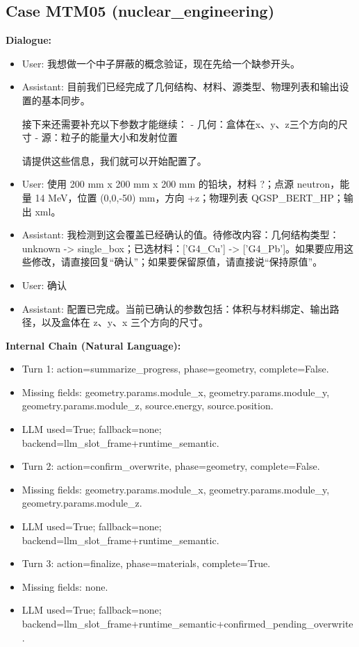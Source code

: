 \documentclass[11pt]{ctexart}
\begin{document}
\subsection{Case MTM05 (nuclear\_engineering)}
\textbf{Dialogue:}
\begin{itemize}
\item User: 我想做一个中子屏蔽的概念验证，现在先给一个缺参开头。
\item Assistant: 目前我们已经完成了几何结构、材料、源类型、物理列表和输出设置的基本同步。

接下来还需要补充以下参数才能继续：
- 几何：盒体在x、y、z三个方向的尺寸
- 源：粒子的能量大小和发射位置

请提供这些信息，我们就可以开始配置了。
\item User: 使用 200 mm x 200 mm x 200 mm 的铅块，材料 ?；点源 neutron，能量 14 MeV，位置 (0,0,-50) mm，方向 +z；物理列表 QGSP\_BERT\_HP；输出 xml。
\item Assistant: 我检测到这会覆盖已经确认的值。待修改内容：几何结构类型：unknown -> single\_box；已选材料：['G4\_Cu'] -> ['G4\_Pb']。如果要应用这些修改，请直接回复“确认”；如果要保留原值，请直接说“保持原值”。
\item User: 确认
\item Assistant: 配置已完成。当前已确认的参数包括：体积与材料绑定、输出路径，以及盒体在 z、y、x 三个方向的尺寸。
\end{itemize}
\textbf{Internal Chain (Natural Language):}
\begin{itemize}
\item Turn 1: action=summarize\_progress, phase=geometry, complete=False.
\item Missing fields: geometry.params.module\_x, geometry.params.module\_y, geometry.params.module\_z, source.energy, source.position.
\item LLM used=True; fallback=none; backend=llm\_slot\_frame+runtime\_semantic.
\item Turn 2: action=confirm\_overwrite, phase=geometry, complete=False.
\item Missing fields: geometry.params.module\_x, geometry.params.module\_y, geometry.params.module\_z.
\item LLM used=True; fallback=none; backend=llm\_slot\_frame+runtime\_semantic.
\item Turn 3: action=finalize, phase=materials, complete=True.
\item Missing fields: none.
\item LLM used=True; fallback=none; backend=llm\_slot\_frame+runtime\_semantic+confirmed\_pending\_overwrite.
\end{itemize}
\end{document}
